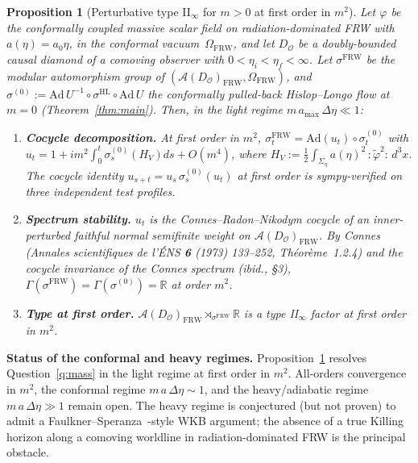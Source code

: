 \documentclass[11pt]{article}
\newtheorem{proposition}[theorem]{Proposition}
\theoremstyle{definition}
\newcommand{\R}{\mathbb{R}}
\renewcommand{\AA}{\mathcal{A}}
\newcommand{\OO}{\mathcal{O}}
\newcommand{\HL}{\mathrm{HL}}
\newcommand{\FRW}{\mathrm{FRW}}
\begin{document}
\begin{proposition}[Perturbative type II$_\infty$ for $m>0$ at first order in $m^2$]\label{prop:mass-firstorder}
Let $\varphi$ be the conformally coupled \emph{massive} scalar field on radiation-dominated FRW with $a(\eta)=a_0\eta$, in the conformal vacuum~$\Omega_\FRW$, and let $D_\OO$ be a doubly-bounded causal diamond of a comoving observer with $0<\eta_i<\eta_f<\infty$. Let $\sigma^\FRW$ be the modular automorphism group of $(\AA(D_\OO)_\FRW,\Omega_\FRW)$, and $\sigma^{(0)} := \mathrm{Ad}\,U^{-1}\circ \sigma^\HL\circ \mathrm{Ad}\,U$ the conformally pulled-back Hislop--Longo flow at $m=0$ (Theorem~\ref{thm:main}). Then, in the \emph{light regime} $m\,a_{\max}\,\Delta\eta\ll 1$:
\begin{enumerate}
\item \textbf{Cocycle decomposition.} At first order in $m^2$, $\sigma^\FRW_t = \mathrm{Ad}(u_t)\circ \sigma^{(0)}_t$ with $u_t = 1 + i m^2 \int_0^t \sigma^{(0)}_s(H_V) ds + O(m^4)$, where $H_V := \tfrac12\!\int_{\Sigma_\eta}\! a(\eta)^2\,{:}\!\tilde\varphi^2\!{:}\!\,d^3x$. The cocycle identity $u_{s+t}=u_s\,\sigma^{(0)}_s(u_t)$ at first order is sympy-verified on three independent test profiles.
\item \textbf{Spectrum stability.} $u_t$ is the Connes--Radon--Nikodym cocycle of an inner-perturbed faithful normal semifinite weight on $\AA(D_\OO)_\FRW$. By Connes (\emph{Annales scientifiques de l'\'ENS} \textbf{6} (1973) 133--252, Th\'eor\`eme~1.2.4) and the cocycle invariance of the Connes spectrum (\emph{ibid.}, \S3), $\Gamma(\sigma^\FRW) = \Gamma(\sigma^{(0)}) = \R$ at order $m^2$.
\item \textbf{Type at first order.} $\AA(D_\OO)_\FRW \rtimes_{\sigma^\FRW} \R$ is a type II$_\infty$ factor at first order in $m^2$.
\end{enumerate}
\end{proposition}

\noindent\textbf{Status of the conformal and heavy regimes.} Proposition~\ref{prop:mass-firstorder} resolves Question~\ref{q:mass} in the light regime at first order in $m^2$. All-orders convergence in $m^2$, the conformal regime $m\,a\,\Delta\eta\sim 1$, and the heavy/adiabatic regime $m\,a\,\Delta\eta\gg 1$ remain open. The heavy regime is conjectured (but not proven) to admit a Faulkner--Speranza~\cite{FaulknerSperanza2024}-style WKB argument; the absence of a true Killing horizon along a comoving worldline in radiation-dominated FRW is the principal obstacle.
\end{document}
